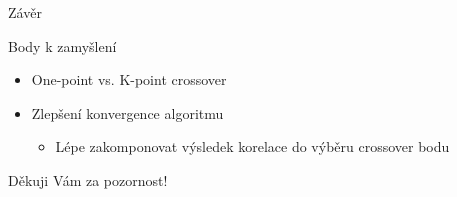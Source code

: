 \documentclass[aspectratio=169, xcolor=dvipsnames]{beamer}
\begin{document}
\begin{frame}{Závěr}
  \begin{block}{Body k zamyšlení}
    \begin{itemize}
        \pause
      \item One-point vs. K-point crossover
        \pause
      \item Zlepšení konvergence algoritmu
        \begin{itemize}
            \pause
          \item Lépe zakomponovat výsledek korelace do výběru crossover bodu 
        \end{itemize}
     \end{itemize}
  \end{block}
\end{frame}

\begin{frame}
  \begin{center}
    Děkuji Vám za pozornost! 
  \end{center}
\end{frame}
\end{document}
